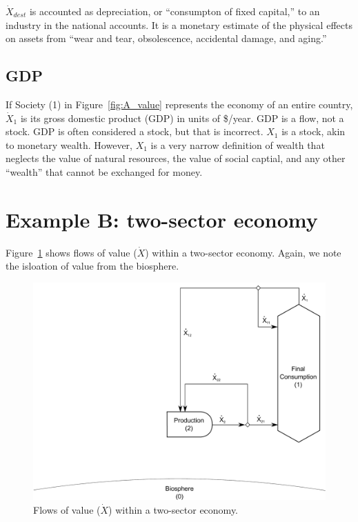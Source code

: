 $\dot{X}_{dest}$ is accounted as depreciation, 
or ``consumpton of fixed capital,'' %
to an industry in the national accounts. 
It is a monetary estimate of the physical effects on assets from 
``wear and tear, obsolescence, accidental damage,
and aging.''~\cite{katz2008} 


\subsection{GDP}

If Society (1) in Figure~\ref{fig:A_value} represents 
the economy of an entire country, 
$\dot{X}_{1}$ is its gross domestic product (GDP)
in units of \$/year. 
GDP is a flow, not a stock. 
GDP is often considered a stock, but that is incorrect. 
$X_{1}$ is a stock, akin to monetary wealth. 
However, $X_{1}$ is a very
narrow definition of wealth
that neglects the value of natural resources, 
the value of social captial, and any
other ``wealth'' that cannot be exchanged for money. 


\section{Example B: two-sector economy} %

Figure~\ref{fig:B_value} shows flows of value ($\dot{X}$) 
within a two-sector economy. 
Again, we note the isloation of value from the biosphere.

\begin{figure}[!ht]
\centering
\includegraphics[width=0.8\linewidth]{Part_2/Chapter_Values/images/2_sector_value.pdf}
\caption[Flows of value within a two-sector economy]{Flows of value ($\dot{X}$) within a two-sector economy.}
\label{fig:B_value}
\end{figure}

